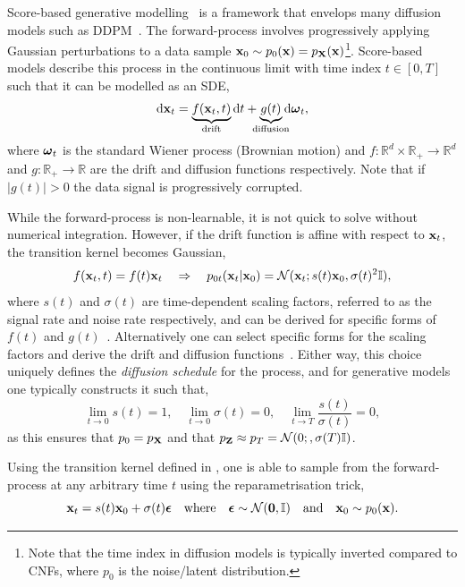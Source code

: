 Score-based generative modelling~\cite{ScoreMatching, ScoreBasedGenerativeModeling} is a framework that envelops many diffusion models such as DDPM~\cite{DDPM}.
The forward-process involves progressively applying Gaussian perturbations to a data sample $\mathbf{x}_0 \sim p_0(\mathbf{x}) = p_{\mathbf{X}}(\mathbf{x})$\footnote{Note that the time index in diffusion models is typically inverted compared to CNFs, where $p_0$ is the noise/latent distribution.}.
Score-based models describe this process in the continuous limit with time index $t \in [0, T]$ such that it can be modelled as an SDE,
\begin{equation}
    \label{eq:sde}
    \diff \x_t = \underbrace{f(\x_t, t)}_{\mathclap{\text{drift}}} \diff t + \underbrace{g(t)}_{\mathclap{\text{diffusion}}} \diff \w_t,
\end{equation}
where $\boldsymbol{\omega}_t$ is the standard Wiener process (Brownian motion) and $f: \mathbb{R}^d \times \mathbb{R}_{+} \rightarrow \mathbb{R}^d$ and $g: \mathbb{R}_{+} \rightarrow \mathbb{R}$ are the drift and diffusion functions respectively.
Note that if $|g(t)| > 0$ the data signal is progressively corrupted.

While the forward-process is non-learnable, it is not quick to solve without numerical integration.
However, if the drift function is affine with respect to $\mathbf{x}_t$, the transition kernel becomes Gaussian,
\begin{equation}
    \label{eq:gaussian_kernel}
    f(\mathbf{x}_t, t) = f(t)\mathbf{x}_t \quad \Rightarrow \quad p_{0t}(\mathbf{x}_t|\mathbf{x}_0) = \mathcal{N}(\mathbf{x}_t; s(t)\mathbf{x}_0, \sigma(t)^2 \mathbb{I}),
\end{equation}
where $s(t)$ and $\sigma(t)$ are time-dependent scaling factors, referred to as the signal rate and noise rate respectively, and can be derived for specific forms of $f(t)$ and $g(t)$~\cite{sarkka2019applied}.
Alternatively one can select specific forms for the scaling factors and derive the drift and diffusion functions~\cite{ElucidatingDesignSpace}.
Either way, this choice uniquely defines the \textit{diffusion schedule} for the process, and for generative models one typically constructs it such that,
\begin{equation}
    \label{eq:diffusion_schedule}
    \lim_{t \rightarrow 0} s(t) = 1, \quad \lim_{t \rightarrow 0} \sigma(t) = 0, \quad \lim_{t \rightarrow T} \frac{s(t)}{\sigma(t)} = 0,
\end{equation}
as this ensures that $p_0 = p_{\mathbf{X}}$ and that $p_{\mathbf{Z}} \approx p_T = \mathcal{N}(0;, \sigma(T) \mathbb{I})$.

Using the transition kernel defined in , one is able to sample from the forward-process at any arbitrary time $t$ using the reparametrisation trick,
\begin{equation}
    \label{eq:reparametrisation}
    \mathbf{x}_t = s(t)\mathbf{x}_0 + \sigma(t) \boldsymbol{\epsilon} \quad \text{where} \quad \boldsymbol{\epsilon} \sim \mathcal{N}(\mathbf{0}, \mathbb{I}) \quad \text{and} \quad \mathbf{x}_0 \sim p_0(\mathbf{x}).
\end{equation}

